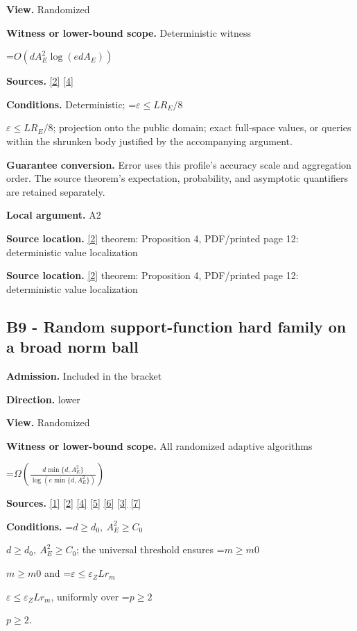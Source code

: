 \documentclass[10pt,a4paper]{article}
\newcommand{\AtlasMath}[1]{\par\begingroup\centering\setbox0=\hbox{$\displaystyle #1$}\ifdim\wd0>1.4\linewidth\typeout{ATLAS WIDE FORMULA: \the\wd0}\fi\ifdim\wd0>\linewidth\resizebox{\linewidth}{!}{\box0}\else\box0\fi\par\endgroup}
\newcommand{\AtlasInlineMath}[1]{\begingroup\setbox0=\hbox{$#1$}\ifdim\wd0>.4\linewidth\endgroup\AtlasMath{#1}\else\endgroup$#1$\fi}
\begin{document}
\textbf{View.} Randomized

\textbf{Witness or lower-bound scope.} Deterministic witness

\AtlasMath{O\!\left(dA_E^2\log(edA_E)\right)}
\textbf{Sources.} \href{https://arxiv.org/html/2607.16558v2}{[2]} \href{https://www.mathnet.ru/php/archive.phtml?jrnid=mzm&option_lang=eng&paperid=1697&wshow=paper}{[4]}

\textbf{Conditions.} Deterministic; \AtlasInlineMath{\varepsilon\le LR_E/8}; projection onto the public domain; exact full-space values, or queries within the shrunken body justified by the accompanying argument.

\textbf{Guarantee conversion.} Error uses this profile's accuracy scale and aggregation order. The source theorem's expectation, probability, and asymptotic quantifiers are retained separately.

\textbf{Local argument.} A2

\textbf{Source location.} \href{https://arxiv.org/html/2607.16558v2}{[2]} theorem: Proposition 4, PDF/printed page 12: deterministic value localization

\textbf{Source location.} \href{https://arxiv.org/html/2607.16558v2}{[2]} theorem: Proposition 4, PDF/printed page 12: deterministic value localization

\subsection{B9 - Random support-function hard family on a broad norm ball}
\textbf{Admission.} Included in the bracket

\textbf{Direction.} lower

\textbf{View.} Randomized

\textbf{Witness or lower-bound scope.} All randomized adaptive algorithms

\AtlasMath{\Omega\!\left(\frac{d\min\{d,A_E^2\}}{\log(e\min\{d,A_E^2\})}\right)}
\textbf{Sources.} \href{https://arxiv.org/html/2610.00345v1}{[1]} \href{https://arxiv.org/html/2607.16558v2}{[2]} \href{https://www.mathnet.ru/php/archive.phtml?jrnid=mzm&option_lang=eng&paperid=1697&wshow=paper}{[4]} \href{https://arxiv.org/abs/1802.09022}{[5]} \href{https://proceedings.neurips.cc/paper_files/paper/2022/file/329ef22fd8cb68223d5df09a037f7dd9-Paper-Conference.pdf}{[6]} \href{https://jmlr.org/papers/volume18/16-632/16-632.pdf}{[3]} \href{https://arxiv.org/pdf/1707.08486v2}{[7]}

\textbf{Conditions.} \AtlasInlineMath{d\ge d_0,\ A_E^2\ge C_0}; the universal threshold ensures \AtlasInlineMath{m\ge m0} and \AtlasInlineMath{\varepsilon \le \varepsilon _Z Lr_m}, uniformly over \AtlasInlineMath{p\ge 2}.
\end{document}
